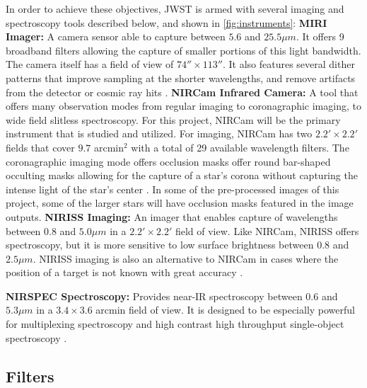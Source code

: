 \documentclass[10pt,twocolumn,letterpaper]{article}
\begin{document}
In order to achieve these objectives, JWST is armed with several imaging and spectroscopy tools described below, and shown in \cref{fig:instruments}:
\newline
\textbf{MIRI Imager:} A camera sensor able to capture between $5.6$ and $25.5\mu m$. It offers 9 broadband filters allowing the capture of smaller portions of this light bandwidth. 
The camera itself has a field of view of $74'' \times 113''$. It also features several dither patterns that improve sampling at the shorter wavelengths, and remove artifacts from the detector or cosmic ray hits \cite{webbmiri}.
\newline
\textbf{NIRCam Infrared Camera:} A tool that offers many observation modes from regular imaging to coronagraphic imaging, to wide field slitless spectroscopy. For this project, NIRCam will be the primary instrument that is studied and utilized.
For imaging, NIRCam has two $2.2' \times 2.2'$ fields that cover $9.7$ arcmin$^2$ with a total of 29 available wavelength filters.
The coronagraphic imaging mode offers occlusion masks offer round bar-shaped occulting masks allowing for the capture of a star's corona without capturing the intense light of the star's center \cite{webbnircam}. In some of the pre-processed images of this project, some of the larger stars will have occlusion masks featured in the image outputs.
\newline
\textbf{NIRISS Imaging:} An imager that enables capture of wavelengths between $0.8$ and $5.0\mu m$ in a $2.2' \times 2.2'$ field of view. 
Like NIRCam, NIRISS offers spectroscopy, but it is more sensitive to low surface brightness between $0.8$ and $2.5\mu m$. 
NIRISS imaging is also an alternative to NIRCam in cases where the position of a target is not known with great accuracy \cite{webbniriss}.
\newline

\textbf{NIRSPEC Spectroscopy:} Provides near-IR spectroscopy between $0.6$ and $5.3 \mu m$ in a $3.4 \times 3.6$ arcmin field of view. It is designed to be especially powerful for multiplexing spectroscopy and high contrast high throughput single-object spectroscopy \cite{webbnirspec}.

\subsection{Filters}
\end{document}
